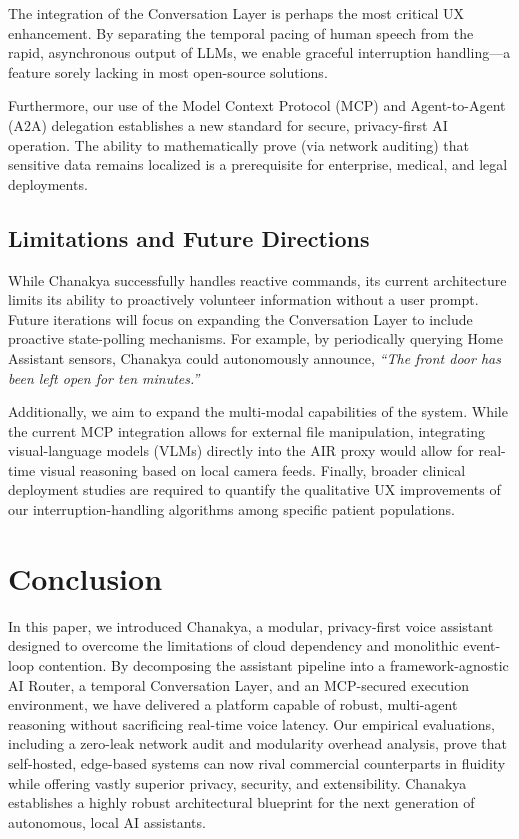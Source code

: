 \documentclass[conference]{IEEEtran}
\begin{document}
The integration of the Conversation Layer is perhaps the most critical UX enhancement. By separating the temporal pacing of human speech from the rapid, asynchronous output of LLMs, we enable graceful interruption handling—a feature sorely lacking in most open-source solutions.

Furthermore, our use of the Model Context Protocol (MCP) and Agent-to-Agent (A2A) delegation establishes a new standard for secure, privacy-first AI operation. The ability to mathematically prove (via network auditing) that sensitive data remains localized is a prerequisite for enterprise, medical, and legal deployments.

\subsection{Limitations and Future Directions}
While Chanakya successfully handles reactive commands, its current architecture limits its ability to proactively volunteer information without a user prompt. Future iterations will focus on expanding the Conversation Layer to include proactive state-polling mechanisms. For example, by periodically querying Home Assistant sensors, Chanakya could autonomously announce, \textit{``The front door has been left open for ten minutes.''}

Additionally, we aim to expand the multi-modal capabilities of the system. While the current MCP integration allows for external file manipulation, integrating visual-language models (VLMs) directly into the AIR proxy would allow for real-time visual reasoning based on local camera feeds. Finally, broader clinical deployment studies are required to quantify the qualitative UX improvements of our interruption-handling algorithms among specific patient populations.

\section{Conclusion}

In this paper, we introduced Chanakya, a modular, privacy-first voice assistant designed to overcome the limitations of cloud dependency and monolithic event-loop contention. By decomposing the assistant pipeline into a framework-agnostic AI Router, a temporal Conversation Layer, and an MCP-secured execution environment, we have delivered a platform capable of robust, multi-agent reasoning without sacrificing real-time voice latency. Our empirical evaluations, including a zero-leak network audit and modularity overhead analysis, prove that self-hosted, edge-based systems can now rival commercial counterparts in fluidity while offering vastly superior privacy, security, and extensibility. Chanakya establishes a highly robust architectural blueprint for the next generation of autonomous, local AI assistants.



\end{document}
